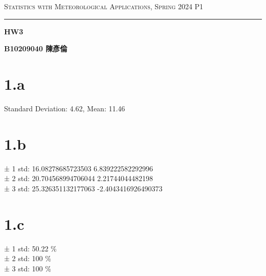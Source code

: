 \documentclass{article}
\author{B10209040 陳彥倫}
\begin{document}
\thispagestyle{empty}
\hfill {\scshape \large Statistics with Meteorological Applications, Spring 2024} \hfill {\scshape P1}
\smallskip
\hrule
\begin{CJK*}{UTF8}{bsmi}
\bigskip
\bigskip
\bigskip

\centerline{\huge \textbf {HW3}}
\bigskip
\centerline{\textbf {B10209040 陳彥倫}}

\section*{1.a}
\begin{center}
\begin{spacing}{2}
    \begin{large}
        Standard Deviation: 4.62, Mean: 11.46
    \end{large}
\end{spacing}
\end{center}


\section*{1.b}
\begin{center}
    \begin{spacing}{2}
        \begin{large}
            ± 1 std: 16.08278685723503 6.839222582292996 \\
            ± 2 std: 20.704568994706044 2.21744044482198 \\
            ± 3 std: 25.326351132177063 -2.4043416926490373 \\
        \end{large}
    \end{spacing}
\end{center}

\section*{1.c}
\begin{center}
    \begin{spacing}{2}
        \begin{large}
            ± 1 std: 50.22 \% \\
            ± 2 std: 100 \% \\
            ± 3 std: 100 \% \\
        \end{large}
    \end{spacing}
\end{center}


\end{CJK*}
\end{document}
